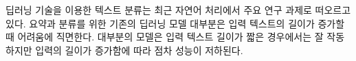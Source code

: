 
\label{sec:abstract_korean}

\makeabstractheaderkorean



딥러닝 기술을 이용한 텍스트 분류는 최근 자연어 처리에서 주요 연구 과제로 떠오르고 있다. 요약과 분류를 위한 기존의 딥러닝 모델 대부분은 입력 텍스트의 길이가 증가할 때 어려움에 직면한다. 대부분의 모델은 입력 텍스트 길이가 짧은 경우에서는 잘 작동하지만 입력의 길이가 증가함에 따라 점차 성능이 저하된다.

\par
\restoregeometry

